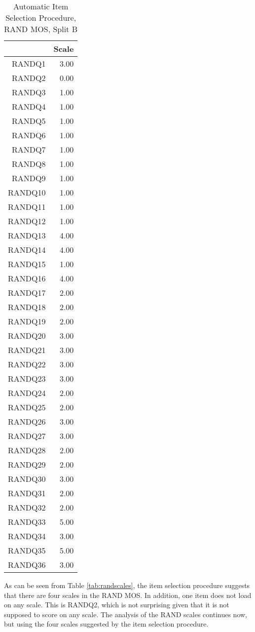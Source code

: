 \documentclass{article}
\begin{document}
\begin{table}[ht]
\centering
\begin{tabular}{rr}
  \hline
 & Scale \\ 
  \hline
RANDQ1 & 3.00 \\ 
  RANDQ2 & 0.00 \\ 
  RANDQ3 & 1.00 \\ 
  RANDQ4 & 1.00 \\ 
  RANDQ5 & 1.00 \\ 
  RANDQ6 & 1.00 \\ 
  RANDQ7 & 1.00 \\ 
  RANDQ8 & 1.00 \\ 
  RANDQ9 & 1.00 \\ 
  RANDQ10 & 1.00 \\ 
  RANDQ11 & 1.00 \\ 
  RANDQ12 & 1.00 \\ 
  RANDQ13 & 4.00 \\ 
  RANDQ14 & 4.00 \\ 
  RANDQ15 & 1.00 \\ 
  RANDQ16 & 4.00 \\ 
  RANDQ17 & 2.00 \\ 
  RANDQ18 & 2.00 \\ 
  RANDQ19 & 2.00 \\ 
  RANDQ20 & 3.00 \\ 
  RANDQ21 & 3.00 \\ 
  RANDQ22 & 3.00 \\ 
  RANDQ23 & 3.00 \\ 
  RANDQ24 & 2.00 \\ 
  RANDQ25 & 2.00 \\ 
  RANDQ26 & 3.00 \\ 
  RANDQ27 & 3.00 \\ 
  RANDQ28 & 2.00 \\ 
  RANDQ29 & 2.00 \\ 
  RANDQ30 & 3.00 \\ 
  RANDQ31 & 2.00 \\ 
  RANDQ32 & 2.00 \\ 
  RANDQ33 & 5.00 \\ 
  RANDQ34 & 3.00 \\ 
  RANDQ35 & 5.00 \\ 
  RANDQ36 & 3.00 \\ 
   \hline
\end{tabular}
\caption{Automatic Item Selection Procedure, RAND MOS, Split B} 
\label{tab:randscales2b}
\end{table}As can be seen from Table \ref{tab:randscales}, the item selection procedure suggests that there are four scales in the RAND MOS.  In addition, one item does not load on any scale.  This is RANDQ2, which is not surprising given that it is not supposed to score on any scale.  The analysis of the RAND scales continues now, but using the four scales suggested by the item selection procedure.
\end{document}
